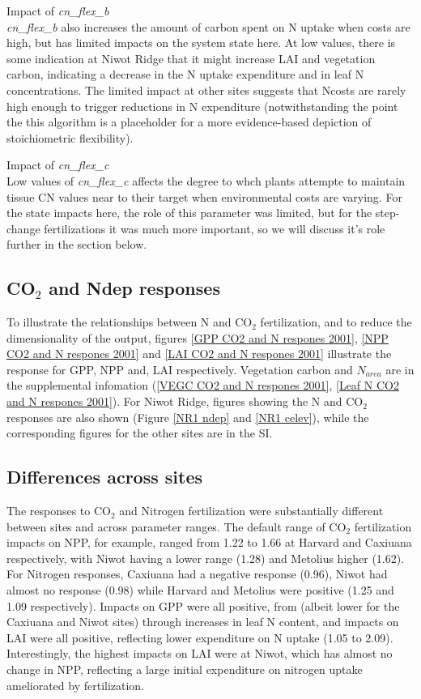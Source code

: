 \documentclass[draft,linenumbers]{agujournal}
\begin{document}
Impact of \emph{cn\_flex\_b}\\
\emph{cn\_flex\_b} also increases the amount of carbon spent on N uptake when costs are high, but has limited impacts on the system state here. At low values, there is some indication at Niwot Ridge that it might increase LAI and vegetation carbon, indicating a decrease in the N uptake expenditure and in leaf N concentrations.  The limited impact at other sites suggests that Ncosts are rarely high enough to trigger reductions in N expenditure (notwithstanding the point the this algorithm is a placeholder for a more evidence-based depiction of stoichiometric flexibility). 

Impact of \emph{cn\_flex\_c}\\
 Low values of \emph{cn\_flex\_c} affects the degree to whch plants attempte to maintain tissue CN values near to their target when environmental costs are varying. For the state impacts here, the role of this parameter was limited, but for the step-change fertilizations it was much more important, so we will discuss it's role further in the section below. 

\subsection{CO$_{2}$ and Ndep responses}

To illustrate the relationships between N and CO$_{2}$ fertilization, and to reduce the dimensionality of the output, figures \ref{GPP CO2 and N respones 2001}, \ref{NPP CO2 and N respones 2001} and \ref{LAI CO2 and N respones 2001} illustrate the response for GPP, NPP and, LAI respectively. Vegetation carbon and $N_{area}$ are in the supplemental infomation (\ref{VEGC CO2 and N respones 2001}, \ref{Leaf N CO2 and N respones 2001}).  For Niwot Ridge, figures showing the N and CO$_{2}$ responses are also shown (Figure \ref{NR1 ndep} and \ref{NR1 celev}), while the corresponding figures for the other sites are in the SI.

\subsection{Differences across sites}
The responses to CO$_{2}$ and Nitrogen fertilization were substantially different between sites and across parameter ranges. The default range of CO$_{2}$ fertilization impacts on NPP, for example, ranged from 1.22 to 1.66 at Harvard and Caxiuana respectively, with Niwot having a lower range (1.28) and Metolius higher (1.62). For Nitrogen responses, Caxiuana had a negative response (0.96), Niwot had almost no response (0.98) while Harvard and Metolius were positive (1.25 and 1.09 respectively). Impacts on GPP were all positive, from  (albeit lower for the Caxiuana and Niwot sites) through increases in leaf N content, and impacts on LAI were all positive, reflecting lower expenditure on N uptake (1.05 to 2.09). Interestingly, the highest impacts on LAI were at Niwot, which has almost no change in NPP, reflecting a large initial expenditure on nitrogen uptake ameliorated by fertilization.   
 
\end{document}
